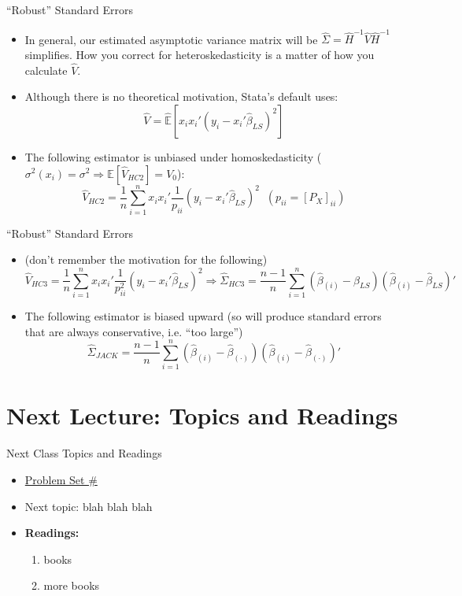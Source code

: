 \documentclass[fleqn, 10pt]{beamer}
\newcommand{\E}{\mathbb{E}}
\begin{document}
\begin{frame}{``Robust'' Standard Errors}
	
	\begin{itemize}
		\item In general, our estimated asymptotic variance matrix will be \(\hat{\Sigma} = \hat{H}^{-1} \hat{V} \hat{H}^{-1} \) simplifies. How you correct for heteroskedasticity is a matter of how you calculate \( \hat{V} \).
		\item Although there is no theoretical motivation, Stata's default uses:
		\[ \hat{V} = \hat{\E} [x_i x_i' (y_i - x_i' \hat{\beta}_{LS})^2] \]
		\item The following estimator is unbiased under homoskedasticity (\(\sigma^2(x_i) = \sigma^2 \Rightarrow \E[\hat{V}_{HC2}] = V_0 \)):
		\[ \hat{V}_{HC2} = \frac{1}{n} \sum_{i=1}^{n} x_i x_i' \frac{1}{p_{ii}} (y_i - x_i' \hat{\beta}_{LS})^2 \;\; (p_{ii} = [P_X]_{ii}) \]
	\end{itemize}
	
\end{frame}

\begin{frame}{``Robust'' Standard Errors}
	
	\begin{itemize}
		\item (don't remember the motivation for the following)
		\[ \hat{V}_{HC3} = \frac{1}{n} \sum_{i=1}^{n} x_i x_i' \frac{1}{p_{ii}^2} (y_i - x_i' \hat{\beta}_{LS})^2 \Rightarrow \hat{\Sigma}_{HC3} = \frac{n-1}{n} \sum_{i=1}^n \left( \hat{\beta}_{(i)} - \hat{\beta}_{LS} \right) \left( \hat{\beta}_{(i)} - \hat{\beta}_{LS} \right)' \]
		\item The following estimator is biased upward (so will produce standard errors that are always conservative, i.e. ``too large'')
		\[ \hat{\Sigma}_{JACK} = \frac{n-1}{n} \sum_{i=1}^n \left( \hat{\beta}_{(i)} - \hat{\beta}_{(\cdot)} \right) \left( \hat{\beta}_{(i)} - \hat{\beta}_{(\cdot)} \right)' \]
		
	\end{itemize}
	
\end{frame}

\section{Next Lecture: Topics and Readings}

\begin{frame}{Next Class Topics and Readings}
	
	\begin{itemize}
		\item \underline{Problem Set \#}
		\item Next topic: blah blah blah
		\item \textbf{Readings:}
		\begin{enumerate}
			\item books
			\item more books
		\end{enumerate}
	\end{itemize}
	
\end{frame}
\end{document}
